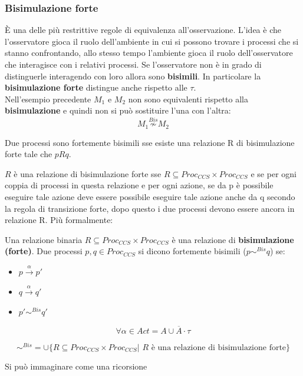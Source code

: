 \subsubsection{Bisimulazione forte}
 È una delle più restrittive regole di equivalenza all'osservazione. L'idea è che l'osservatore gioca il ruolo dell'ambiente in cui si possono trovare i processi che si stanno confrontando, allo stesso tempo l'ambiente gioca il ruolo dell'osservatore che interagisce con i relativi processi. Se l'osservatore non è in grado di distinguerle interagendo con loro allora sono \textbf{bisimili}. In particolare la \textbf{bisimulazione forte} distingue anche rispetto alle $\tau$.\\ Nell'esempio precedente $M_1$ e $M_2$ non sono equivalenti rispetto alla \textbf{bisimulazione} e quindi non
si può sostituire l'una con l'altra:
\[M_1\stackrel{Bis}{\not\sim}M_2\]
\begin{definizione}
  Due processi sono fortemente bisimili sse esiste una relazione R di bisimulazione forte tale che $pRq$.
\end{definizione}
$R$ è una relazione di bisimulazione forte sse $R\subseteq Proc_{CCS}\times Proc_{CCS}$ e se per ogni coppia di processi in questa relazione e per ogni
azione, se da p è possibile eseguire tale azione deve essere possibile eseguire tale azione anche
da q secondo la regola di transizione forte, dopo questo i due processi devono essere ancora in
relazione R. Più formalmente:
\begin{definizione}
  Una relazione binaria $R\subseteq Proc_{CCS}\times Proc_{CCS}$ è una
  relazione di \textbf{bisimulazione (forte)}. Due processi $p, q\in Proc_{CCS}$ si dicono fortemente bisimili ($p\sim^{Bis}q$) se:
  \begin{itemize}
    \item $p\stackrel{\alpha}{\rightarrow}p'$ \item $q\stackrel{\alpha}{\rightarrow}q'$
    \item $p'\sim^{Bis}q'$
\end{itemize}
\[\forall \alpha \in Act=A\cup \overline{A}\cdot \tau\]

\begin{nota}
 \[\sim^{Bis}=\cup\{R\subseteq Proc_{CCS}\times Proc_{CCS}|\,\, R \mbox{ è una
    relazione di bisimulazione forte}\}\]
\end{nota}
    \begin{nota}
     Si può immaginare come una ricorsione
    \end{nota}
\end{definizione} \vspace{5mm} %
